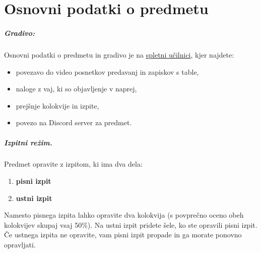 \chapter*{Osnovni podatki o predmetu}

\paragraph{Gradivo:}
%
Osnovni podatki o predmetu in gradivo je na \href{https://ucilnica.fmf.uni-lj.si/}{spletni učilnici}, kjer najdete:
\begin{itemize}
\item povezavo do video posnetkov predavanj in zapiskov s table,
\item naloge z vaj, ki so objavljenje v naprej,
\item prejšnje kolokvije in izpite,
\item povezo na Discord server za predmet.
\end{itemize}

\paragraph{Izpitni režim.}
%
Predmet opravite z izpitom, ki ima dva dela:
%
\begin{enumerate}
\item \textbf{pisni izpit}
\item \textbf{ustni izpit}
\end{enumerate}
%
Namesto pisnega izpita lahko opravite dva kolokvija (s povprečno oceno obeh kolokvijev skupaj vsaj 50\%). Na ustni izpit pridete šele, ko ste opravili pisni izpit. Če ustnega izpita ne opravite, vam pisni izpit propade in ga
morate ponovno opravljati.
